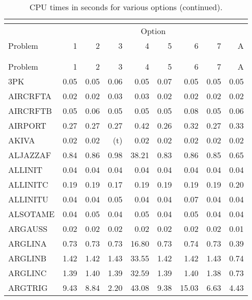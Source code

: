 \documentclass[11pt,twoside]{article}
\begin{document}
\setlength{\LTcapwidth}{5in}
\newpage
\setlongtables
{\small
\begin{longtable}[c]{|l|r|r|r|r|r|r|r|r|}
\caption{\label{t1} CPU times in seconds for various options.} \\
\multicolumn{9}{c}{$ $} \\ \hline
          &  \multicolumn{8}{c|}{Option}  \\
Problem   & 1 & 2 & 3 & 4 & 5 & 6 & 7 & A \\
\hline
\endfirsthead
\caption{CPU times in seconds for various options (continued).}  \\
\multicolumn{9}{c}{$ $} \\
\hline
Problem   & 1 & 2 & 3 & 4 & 5 & 6 & 7 & A \\
\hline                                        
\endhead
\hline
\endfoot
\hline
\endlastfoot
3PK & 0.05 & 0.05 & 0.06 & 0.05 & 0.07 & 0.05 & 0.05 & 0.05 \\
AIRCRFTA & 0.02 & 0.02 & 0.03 & 0.03 & 0.02 & 0.02 & 0.02 & 0.02 \\
AIRCRFTB & 0.05 & 0.06 & 0.05 & 0.05 & 0.05 & 0.08 & 0.05 & 0.06 \\
AIRPORT & 0.27 & 0.27 & 0.27 & 0.42 & 0.26 & 0.32 & 0.27 & 0.33 \\
AKIVA & 0.02 & 0.02 & (t) & 0.02 & 0.02 & 0.02 & 0.02 & 0.02 \\
ALJAZZAF & 0.84 & 0.86 & 0.98 & 38.21 & 0.83 & 0.86 & 0.85 & 0.65 \\
ALLINIT & 0.04 & 0.04 & 0.04 & 0.04 & 0.04 & 0.04 & 0.04 & 0.04 \\
ALLINITC & 0.19 & 0.19 & 0.17 & 0.19 & 0.19 & 0.19 & 0.19 & 0.20 \\
ALLINITU & 0.04 & 0.04 & 0.05 & 0.04 & 0.04 & 0.07 & 0.04 & 0.04 \\
ALSOTAME & 0.04 & 0.05 & 0.04 & 0.05 & 0.04 & 0.05 & 0.04 & 0.04 \\
ARGAUSS & 0.02 & 0.02 & 0.02 & 0.02 & 0.02 & 0.02 & 0.02 & 0.01 \\
ARGLINA & 0.73 & 0.73 & 0.73 & 16.80 & 0.73 & 0.74 & 0.73 & 0.39 \\
ARGLINB & 1.42 & 1.42 & 1.43 & 33.55 & 1.42 & 1.42 & 1.43 & 0.74 \\
ARGLINC & 1.39 & 1.40 & 1.39 & 32.59 & 1.39 & 1.40 & 1.38 & 0.73 \\
ARGTRIG & 9.43 & 8.84 & 2.20 & 43.08 & 9.38 & 15.03 & 6.63 & 4.43 \\

\end{longtable}}
\end{document}
